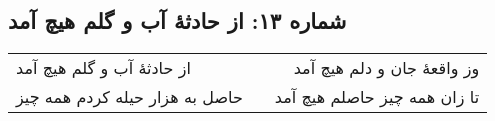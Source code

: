 \begin{center}
\section*{شماره ۱۳: از حادثۀ آب و گلم هیچ آمد}
\label{sec:013}
\begin{longtable}{l p{0.5cm} r}
از حادثهٔ آب و گلم هیچ آمد
&&
وز واقعهٔ جان و دلم هیچ آمد
\\
حاصل به هزار حیله کردم همه چیز
&&
تا زان همه چیز حاصلم هیچ‌ آمد
\\
\end{longtable}
\end{center}
